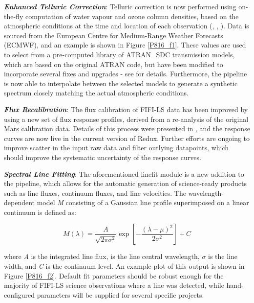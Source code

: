\documentclass[11pt,twoside]{article}
\begin{document}
\textbf{\emph{Enhanced Telluric Correction}}: Telluric correction is now performed using on-the-fly computation
of water vapour and ozone column densities, based on the atmospheric conditions at the time and location
of each observation (\citet{FIFI_Fischer_2021}, \citet{FIFI_Iserlohe_2021}, \citet{FIFI_Iserlohe_2022}).
Data is sourced from the European Centre for Medium-Range Weather Forecasts (ECMWF), and an example is shown in Figure \ref{P816_f1}.
These values are used to select from a pre-computed library of ATRAN\_SDC transmission models, which are
based on the original ATRAN code, but have been modified to incorporate several fixes and upgrades - see \citet{P809_adassxxxvi} for details.
Furthermore, the pipeline is now able to interpolate between the selected models to generate
a synthetic spectrum closely matching the actual atmospheric conditions.\smallskip

\textbf{\emph{Flux Recalibration}}: The flux calibration of FIFI-LS data has been improved by using a new set of
flux response profiles, derived from a re-analysis of the original Mars calibration data. Details of
this process were presented in \citet{PO-30_adassxxxv}, and the response curves are now live in the
current version of Redux. Further efforts are ongoing to improve scatter in the input raw data and filter
outlying datapoints, which should improve the systematic uncertainty of the response curves.\smallskip

\textbf{\emph{Spectral Line Fitting}}: The aforementioned linefit module is a new addition to the pipeline, which
allows for the automatic generation of science-ready products such as line fluxes, continuum fluxes, and
line velocities. The wavelength-dependent model \textit{M} consisting of a Gaussian line profile superimposed on a
linear continuum is defined as:

\begin{displaymath}
M(\lambda) = \frac{A}{\sqrt{2\pi\sigma^2}} \exp\left[-\frac{(\lambda-\mu)^2}{2\sigma^2}\right] + C
\end{displaymath}

where \textit{A} is the integrated line flux, \textit{\textmu} is the line central wavelength, $\sigma$ is the line width,
and \textit{C} is the continuum level. An example plot of this output is shown in Figure \ref{P816_f2}.
Default fit parameters should be robust enough for the majority of FIFI-LS science observations where a line
was detected, while hand-configured parameters will be supplied for several specific projects.\smallskip
\end{document}
